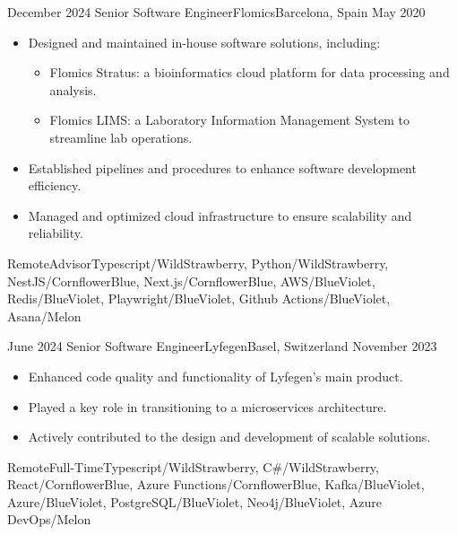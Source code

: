 %
%
%
\begin{experiences}

  \experience
  {December 2024} {Senior Software Engineer}{Flomics}{Barcelona, Spain}
  {May 2020}{\begin{itemize}
    \item  Designed and maintained in-house software solutions, including:
    \begin{itemize}
    \item Flomics Stratus: a bioinformatics cloud platform for data processing and analysis.
    \item Flomics LIMS: a Laboratory Information Management System to streamline lab operations.
    \end{itemize}
    \item Established pipelines and procedures to enhance software development efficiency.
    \item Managed and optimized cloud infrastructure to ensure scalability and reliability.
  \end{itemize}}
  {Remote}{Advisor}{Typescript/WildStrawberry, Python/WildStrawberry, NestJS/CornflowerBlue, Next.js/CornflowerBlue, AWS/BlueViolet, Redis/BlueViolet, Playwright/BlueViolet, Github Actions/BlueViolet, Asana/Melon}
  
  \emptySeparator

  \experience
  {June 2024} {Senior Software Engineer}{Lyfegen}{Basel, Switzerland}
  {November 2023}{\begin{itemize}
    \item Enhanced code quality and functionality of Lyfegen's main product.
    \item Played a key role in transitioning to a microservices architecture.
    \item Actively contributed to the design and development of scalable solutions.
  \end{itemize}}
  {Remote}{Full-Time}{Typescript/WildStrawberry, C\#/WildStrawberry, React/CornflowerBlue, Azure Functions/CornflowerBlue, Kafka/BlueViolet, Azure/BlueViolet, PostgreSQL/BlueViolet, Neo4j/BlueViolet, Azure DevOps/Melon}


\end{experiences}
